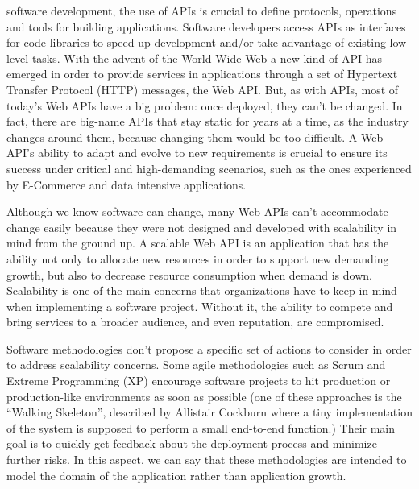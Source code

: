 \documentclass[10pt,article]{IEEEtran}
\begin{document}
% 
% 
% 
% 
 software development, the use of APIs is crucial to define protocols, operations and tools for building applications. Software developers access APIs as interfaces for code libraries to speed up development and/or take advantage of existing low level tasks. With the advent of the World Wide Web a new kind of API has emerged in order to provide services in applications through a set of Hypertext Transfer Protocol (HTTP) messages, the Web API. But, as with APIs, most of today's Web APIs have a big problem: once deployed, they can't be changed. In fact, there are big-name APIs that stay static for years at a time, as the industry changes around them, because changing them would be too difficult\cite{RESTfulWebAPI:richardson}. A Web API's ability to adapt and evolve to new requirements is crucial to ensure its success under critical and high-demanding scenarios, such as the ones experienced by E-Commerce and data intensive applications.


Although we know software can change, many Web APIs can't accommodate change easily because they were not designed and developed with scalability in mind from the ground up\cite{RESTfulWebAPI:richardson}. A scalable Web API is an application that has the ability not only to allocate new resources in order to support new demanding growth, but also to decrease resource consumption when demand is down. Scalability is one of the main concerns that organizations have to keep in mind when implementing a software project. Without it, the ability to compete and bring services to a broader audience, and even reputation, are compromised.


Software methodologies don't propose a specific set of actions to consider in order to address scalability concerns. Some agile methodologies such as Scrum and Extreme Programming (XP) encourage software projects to hit production or production-like environments as soon as possible (one of these approaches is the ``Walking Skeleton'', described by Allistair Cockburn\cite{cockburn} where a tiny implementation of the system is supposed to perform a small end-to-end function.) Their main goal is to quickly get feedback about the deployment process and minimize further risks. In this aspect, we can say that these methodologies are intended to model the domain of the application rather than application growth.
\end{document}
